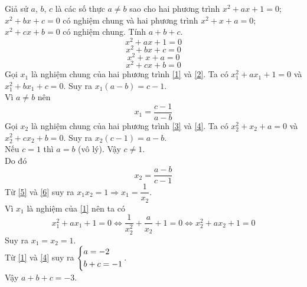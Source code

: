 \begin{ex}%
 Giả sử $a$, $b$, $c$ là các số thực $a \neq b$ sao cho hai phương trình $x^2 + ax + 1 = 0$; $x^2 + bx + c = 0$ có nghiệm chung và hai phương trình $x^2 + x + a = 0$; $x^2 + cx + b = 0$ có nghiệm chung. Tính $a + b + c$.
 \loigiai
  {
  \begin{equation}
   x^2 + ax + 1 = 0 \label{1}
  \end{equation}
  \begin{equation}
   x^2 + bx + c = 0 \label{2}
  \end{equation}
  \begin{equation}
   x^2 + x + a = 0 \label{3}
  \end{equation}
  \begin{equation}
   x^2 + cx + b = 0 \label{4}
  \end{equation}
  Gọi $x_1$ là nghiệm chung của hai phương trình \eqref{1} và \eqref{2}. Ta có $x_1^2 + ax_1 + 1 = 0$ và $x_1^2 + bx_1 + c = 0$. Suy ra $x_1(a - b) = c - 1$.\\
  Vì $a \neq b$ nên
  \begin{equation}
  x_1 =  \dfrac{c - 1}{a - b} \label{5}
  \end{equation}
  Gọi $x_2$ là nghiệm chung của hai phương trình \eqref{3} và \eqref{4}. Ta có $x_2^2 + x_2 + a = 0$ và $x_2^2 + cx_2 + b = 0$. Suy ra $x_2(c - 1) = a - b$.\\
  Nếu $c = 1$ thì $a = b$ (vô lý). Vậy $c \neq 1$.\\
  Do đó
  \begin{equation}
  x_2 =  \dfrac{a - b}{c - 1} \label{6}
  \end{equation}
  Từ \eqref{5} và \eqref{6} suy ra $x_1 x_2 = 1 \Rightarrow x_1 = \dfrac{1}{x_2}$.\\
  Vì $x_1$ là nghiệm của \eqref{1} nên ta có
  $$x_1^2 + ax_1 + 1 = 0 \Leftrightarrow \dfrac{1}{x_2^2} + \dfrac{a}{x_2} + 1 = 0 \Leftrightarrow x_2^2 + ax_2 + 1 = 0$$
  Suy ra $x_1 = x_2 = 1$.\\
  Từ \eqref{1} và \eqref{4} suy ra $\left\{\begin{aligned}& a = -2 \\& b + c = - 1\end{aligned}\right.$.\\
  Vậy $a+ b + c = -3$.
  }
\end{ex}


